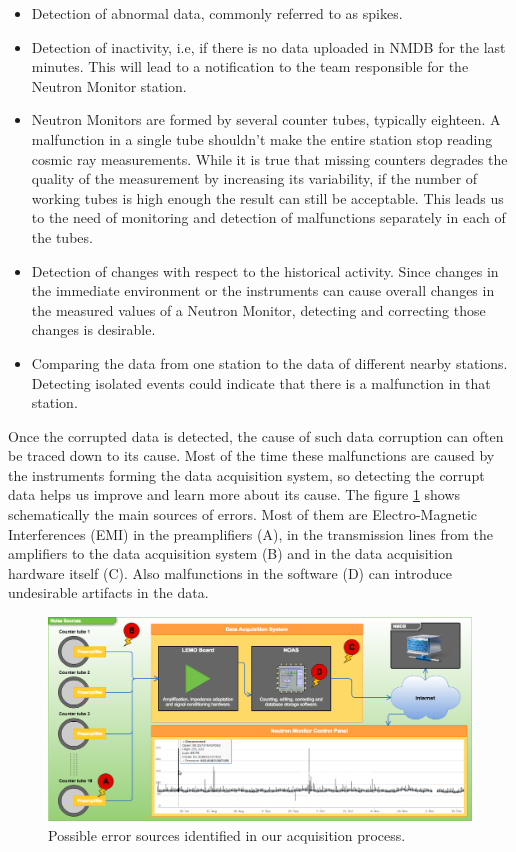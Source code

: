 \documentclass[a4paper]{jpconf}
\begin{document}
\begin{itemize}
	\item Detection of abnormal data, commonly referred to as spikes.
    \item Detection of inactivity, i.e, if there is no data uploaded in NMDB for
        the last minutes. This will lead to a notification to the team
        responsible for the Neutron Monitor station. 
    \item Neutron Monitors are formed by several counter tubes, typically
        eighteen. A malfunction in a single tube shouldn't make the entire
        station stop reading cosmic ray measurements. While it is true that
        missing counters degrades the quality of the measurement by increasing its
        variability, if the number of working tubes is high enough the result can
        still be acceptable. This leads us to the need of monitoring and
        detection of malfunctions separately in each of the tubes.  
    \item Detection of changes with respect to the historical activity.
        Since changes in the immediate environment or the instruments can cause
        overall changes in the measured values of a Neutron Monitor, detecting
        and correcting those changes is desirable.
    \item Comparing the data from one station to the data of different nearby
        stations. Detecting isolated events could indicate that there is a
        malfunction in that station.	
\end{itemize}

Once the corrupted data is detected, the cause of such data corruption can
often be traced down to its cause. Most of the time these malfunctions are
caused by the instruments forming the data acquisition system, so detecting the
corrupt data helps us improve and learn more about its cause. The figure
\ref{fig:NoisePoints} shows schematically the main sources of errors. Most of
them are Electro-Magnetic Interferences (EMI) in the preamplifiers (A), in the
transmission lines from the amplifiers to the data acquisition system (B) and in
the data acquisition hardware itself (C). Also malfunctions in the software (D)
can introduce undesirable artifacts in the data.

\begin{figure}[ht]
    \centering
    \includegraphics[keepaspectratio, width=1\textwidth]{./resources/NoisePoints.png}
    \caption{Possible error sources identified in our acquisition process.}
    \label{fig:NoisePoints}
\end{figure}
\end{document}
